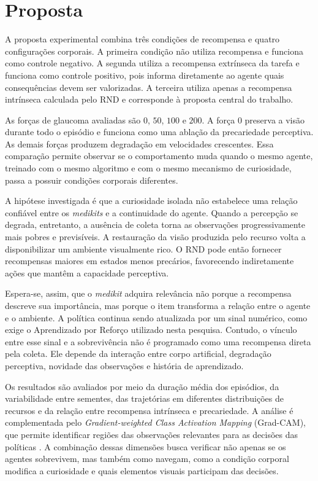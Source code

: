 \section{Proposta}

A proposta experimental combina três condições de recompensa e quatro configurações corporais. A primeira condição não utiliza recompensa e funciona como controle negativo. A segunda utiliza a recompensa extrínseca da tarefa e funciona como controle positivo, pois informa diretamente ao agente quais consequências devem ser valorizadas. A terceira utiliza apenas a recompensa intrínseca calculada pelo RND e corresponde à proposta central do trabalho.

As forças de glaucoma avaliadas são $0$, $50$, $100$ e $200$. A força $0$ preserva a visão durante todo o episódio e funciona como uma ablação da precariedade perceptiva. As demais forças produzem degradação em velocidades crescentes. Essa comparação permite observar se o comportamento muda quando o mesmo agente, treinado com o mesmo algoritmo e com o mesmo mecanismo de curiosidade, passa a possuir condições corporais diferentes.

A hipótese investigada é que a curiosidade isolada não estabelece uma relação confiável entre os \textit{medikits} e a continuidade do agente. Quando a percepção se degrada, entretanto, a ausência de coleta torna as observações progressivamente mais pobres e previsíveis. A restauração da visão produzida pelo recurso volta a disponibilizar um ambiente visualmente rico. O RND pode então fornecer recompensas maiores em estados menos precários, favorecendo indiretamente ações que mantêm a capacidade perceptiva.

Espera-se, assim, que o \textit{medikit} adquira relevância não porque a recompensa descreve sua importância, mas porque o item transforma a relação entre o agente e o ambiente. A política continua sendo atualizada por um sinal numérico, como exige o Aprendizado por Reforço utilizado nesta pesquisa. Contudo, o vínculo entre esse sinal e a sobrevivência não é programado como uma recompensa direta pela coleta. Ele depende da interação entre corpo artificial, degradação perceptiva, novidade das observações e história de aprendizado.

Os resultados são avaliados por meio da duração média dos episódios, da variabilidade entre sementes, das trajetórias em diferentes distribuições de recursos e da relação entre recompensa intrínseca e precariedade. A análise é complementada pelo \textit{Gradient-weighted Class Activation Mapping} (Grad-CAM), que permite identificar regiões das observações relevantes para as decisões das políticas \cite{gradcam}. A combinação dessas dimensões busca verificar não apenas se os agentes sobrevivem, mas também como navegam, como a condição corporal modifica a curiosidade e quais elementos visuais participam das decisões.

